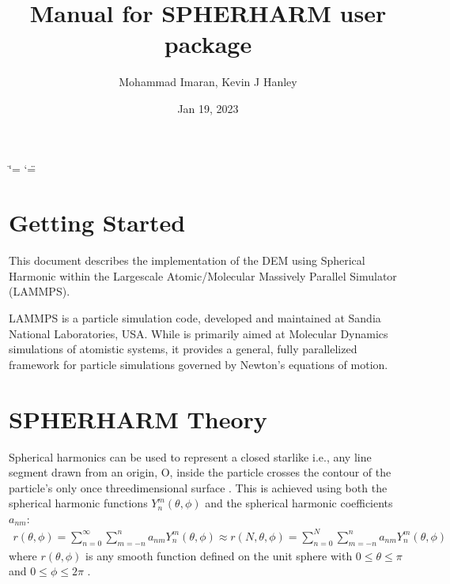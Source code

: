 \documentclass[letterpaper,10pt,english]{sphinxmanual}
\title{Manual for SPHERHARM user package}
\date{Jan 19, 2023}
\author{Mohammad Imaran, Kevin J Hanley}
\begin{document}
\ifdefined\shorthandoff
  \ifnum\catcode`\=\string=\active\shorthandoff{=}\fi
  \ifnum\catcode`\"=\active{}\fi
\fi

\pagestyle{empty}
\sphinxmaketitle
\pagestyle{plain}
\sphinxtableofcontents
\pagestyle{normal}
\label{\detokenize{index::doc}}


\sphinxstepscope


\section{Getting Started}
\label{\detokenize{Sections/1_getting_started:getting-started}}\label{\detokenize{Sections/1_getting_started::doc}}
\sphinxAtStartPar
This document describes the implementation of the DEM using Spherical Harmonic within the Large\sphinxhyphen{}scale Atomic/Molecular Massively Parallel Simulator (LAMMPS).

\sphinxAtStartPar
LAMMPS is a particle simulation code, developed and maintained at Sandia National Laboratories, USA. While is primarily aimed at Molecular Dynamics simulations of atomistic systems, it provides a general, fully parallelized framework for particle simulations governed by Newton’s equations of motion.

\sphinxstepscope


\section{SPHERHARM Theory}
\label{\detokenize{Sections/2_introduction:spherharm-theory}}\label{\detokenize{Sections/2_introduction::doc}}
\sphinxAtStartPar
Spherical harmonics can be used to represent a  closed star\sphinxhyphen{}like i.e., any line segment drawn from an origin, O, inside the particle crosses the  contour of the particle’s only once  three\sphinxhyphen{}dimensional surface . This is achieved using both the spherical harmonic functions \(Y_n^m(\theta,\phi)\) and the spherical harmonic coefficients \(a_{nm}\):
\begin{equation*}
\begin{split}r(\theta,\phi) = \sum_{n=0}^\infty\sum_{m=-n}^n a_{nm} Y_n^m(\theta, \phi) \approx r(N,\theta,\phi) = \sum_{n=0}^N\sum_{m=-n}^n a_{nm} Y_n^m(\theta, \phi)\end{split}
\end{equation*}
\sphinxAtStartPar
where \(r(\theta,\phi)\) is any smooth function defined on the unit sphere with \(0\le\theta\le\pi\) and \(0\le\phi\le 2\pi\)
.
\end{document}
